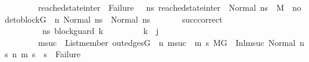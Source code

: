 \begin{isabellebody}
\ \ \ \ \ \ \ \ {\isacharparenleft}{\kern0pt}reached{\isacharunderscore}{\kern0pt}state{\isacharunderscore}{\kern0pt}inter\ {\isasymnoteq}\ Failure\ \ {\isasymand}\ {\isacharparenleft}{\kern0pt}{\isasymforall}ns{}{\isacharprime}{\kern0pt}{\isachardot}{\kern0pt}\ reached{\isacharunderscore}{\kern0pt}state{\isacharunderscore}{\kern0pt}inter\ {\isacharequal}{\kern0pt}\ Normal\ ns{}{\isacharprime}{\kern0pt}\ {\isasymlongrightarrow}\ {\isacharparenleft}{\kern0pt}M{\isacharcomma}{\kern0pt}{\isasymLambda}{\isacharcomma}{\kern0pt}{\isasymGamma}{\isacharcomma}{\kern0pt}{\isasymOmega}\ {\isasymturnstile}\ {\isasymlangle}{\isacharparenleft}{\kern0pt}node{\isacharunderscore}{\kern0pt}to{\isacharunderscore}{\kern0pt}block{\isacharparenleft}{\kern0pt}G{\isacharparenright}{\kern0pt}\ {\isacharbang}{\kern0pt}\ n{\isacharparenright}{\kern0pt}{\isacharcomma}{\kern0pt}\ Normal\ ns{}{\isasymrangle}\ {\isacharbrackleft}{\kern0pt}{\isasymrightarrow}{\isacharbrackright}{\kern0pt}\ Normal\ ns{}{\isacharprime}{\kern0pt}{\isacharparenright}{\kern0pt}{\isacharparenright}{\kern0pt}{\isacharparenright}{\kern0pt}{\isachardoublequoteclose}\isanewline
\ \ \ \ \ \ \ succ{\isacharunderscore}{\kern0pt}correct{\isacharcolon}{\kern0pt}\ \isanewline
\ \ \ \ \ \ \ \ {\isachardoublequoteopen}{\isasymAnd}\ ns{}{\isacharprime}{\kern0pt}{\isacharprime}{\kern0pt}\ block{\isacharunderscore}{\kern0pt}guard\ k{\isachardot}{\kern0pt}\isanewline
\ \ \ \ \ \ \ \ \ k\ {\isacharless}{\kern0pt}\ j\ {\isasymLongrightarrow}\ \isanewline
\ \ \ \ \ \ \ \ {\isacharparenleft}{\kern0pt}{\isasymforall}msuc{}{\isachardot}{\kern0pt}\ \ List{\isachardot}{\kern0pt}member\ {\isacharparenleft}{\kern0pt}out{\isacharunderscore}{\kern0pt}edges{\isacharparenleft}{\kern0pt}G{\isacharparenright}{\kern0pt}\ {\isacharbang}{\kern0pt}\ n{\isacharparenright}{\kern0pt}\ msuc{}\ {\isasymlongrightarrow}\ {\isacharparenleft}{\kern0pt}{\isasymforall}m{}\ s{}{\isachardot}{\kern0pt}\ {\isacharparenleft}{\kern0pt}{\isacharparenleft}{\kern0pt}M{\isacharcomma}{\kern0pt}{\isasymLambda}{\isacharcomma}{\kern0pt}{\isasymGamma}{\isacharcomma}{\kern0pt}{\isasymOmega}{\isacharcomma}{\kern0pt}G\ {\isasymturnstile}\ {\isacharparenleft}{\kern0pt}Inl{\isacharparenleft}{\kern0pt}msuc{}{\isacharparenright}{\kern0pt}{\isacharcomma}{\kern0pt}\ Normal\ ns{}{\isacharprime}{\kern0pt}{\isacharprime}{\kern0pt}{\isacharparenright}{\kern0pt}\ {\isacharminus}{\kern0pt}n{\isasymrightarrow}{\isacharasterisk}{\kern0pt}\ {\isacharparenleft}{\kern0pt}m{}{\isacharcomma}{\kern0pt}\ s{}{\isacharparenright}{\kern0pt}{\isacharparenright}{\kern0pt}\ {\isasymlongrightarrow}\ s{}\ {\isasymnoteq}\ Failure{\isacharparenright}{\kern0pt}{\isacharparenright}{\kern0pt}{\isacharparenright}{\kern0pt}\ {\isasymLongrightarrow}\isanewline

\end{isabellebody}
